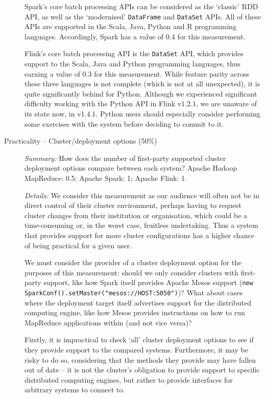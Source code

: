 \begin{description}
      Spark's core batch processing APIs can be considered as the `classic' RDD API, as well as the `modernised' \texttt{DataFrame} and \texttt{DataSet} APIs. All of these APIs are supported in the Scala, Java, Python and R programming languages. Accordingly, Spark has a value of 0.4 for this measurement.

      Flink's core batch processing API is the \texttt{DataSet} API, which provides support to the Scala, Java and Python programming languages, thus earning a value of 0.3 for this measurement. While feature parity across these three languages is not complete (which is not at all unexpected), it is quite significantly behind for Python. Although we experienced significant difficulty working with the Python API in Flink v1.2.1, we are unaware of its state now, in v1.4.1. Python users should especially consider performing some exercises with the system before deciding to commit to it.

    \item[Practicality -- Cluster/deployment options (50\%)]
      \textit{Summary:} How does the number of first-party supported cluster deployment options compare between each system? Apache Hadoop MapReduce: 0.5; Apache Spark: 1; Apache Flink: 1.\medskip

      \textit{Details:} We consider this measurement as our audience will often not be in direct control of their cluster environment, perhaps having to request cluster changes from their institution or organisation, which could be a time-consuming or, in the worst case, fruitless undertaking. Thus a system that provides support for more cluster configurations has a higher chance of being practical for a given user.

      We must consider the provider of a cluster deployment option for the purposes of this measurement: should we only consider clusters with first-party support, like how Spark itself provides Apache Mesos support (\texttt{new SparkConf().setMaster("mesos://HOST:5050")})? What about cases where the deployment target itself advertises support for the distributed computing engine, like how Mesos provides instructions on how to run MapReduce applications within (and not vice versa)? 

      Firstly, it is impractical to check `all' cluster deployment options to see if they provide support to the compared systems. Furthermore, it may be risky to do so, considering that the methods they provide may have fallen out of date -- it is not the cluster's obligation to provide support to specific distributed computing engines, but rather to provide interfaces for arbitrary systems to connect to.


\end{description}
